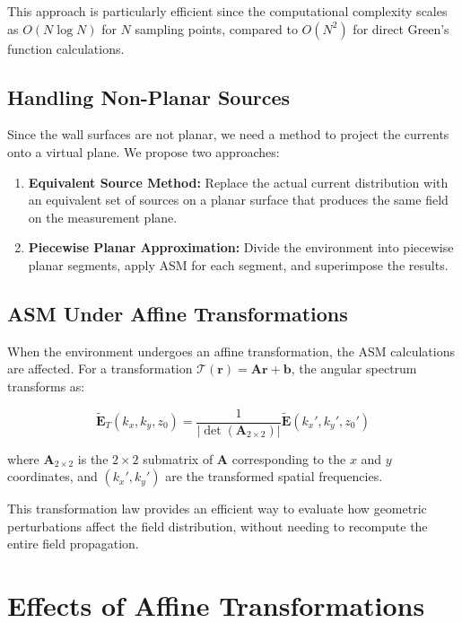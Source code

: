 \documentclass[12pt,a4paper]{article}
\begin{document}
This approach is particularly efficient since the computational complexity scales as $O(N \log N)$ for $N$ sampling points, compared to $O(N^2)$ for direct Green's function calculations.

\subsection{Handling Non-Planar Sources}

Since the wall surfaces are not planar, we need a method to project the currents onto a virtual plane. We propose two approaches:

\begin{enumerate}
    \item \textbf{Equivalent Source Method:} Replace the actual current distribution with an equivalent set of sources on a planar surface that produces the same field on the measurement plane.
    
    \item \textbf{Piecewise Planar Approximation:} Divide the environment into piecewise planar segments, apply ASM for each segment, and superimpose the results.
\end{enumerate}

\subsection{ASM Under Affine Transformations}

When the environment undergoes an affine transformation, the ASM calculations are affected. For a transformation $\mathcal{T}(\mathbf{r}) = \mathbf{A}\mathbf{r} + \mathbf{b}$, the angular spectrum transforms as:

\begin{equation}
    \tilde{\mathbf{E}}_T(k_x, k_y, z_0) = \frac{1}{|\det(\mathbf{A}_{2\times2})|} \tilde{\mathbf{E}}(k_x', k_y', z_0')
\end{equation}

where $\mathbf{A}_{2\times2}$ is the $2 \times 2$ submatrix of $\mathbf{A}$ corresponding to the $x$ and $y$ coordinates, and $(k_x', k_y')$ are the transformed spatial frequencies.

This transformation law provides an efficient way to evaluate how geometric perturbations affect the field distribution, without needing to recompute the entire field propagation.

\section{Effects of Affine Transformations}
\end{document}
